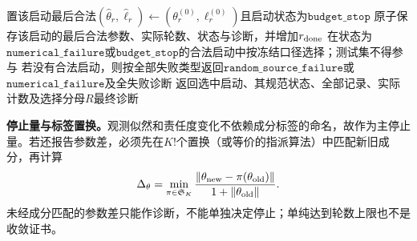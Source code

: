 \begin{AlgorithmContract}
\begin{algorithm}[H]
{  置该启动最后合法$(\widehat\theta_r,\widehat\ell_r)\leftarrow(\theta_r^{(0)},\ell_r^{(0)})$且启动状态为$\mathtt{budget\_stop}$\;
  原子保存该启动的最后合法参数、实际轮数、状态与诊断，并增加$r_{\rm done}$\;
}
在状态为$\mathtt{numerical\_failure}$或$\mathtt{budget\_stop}$的合法启动中按冻结口径选择；测试集不得参与\;
若没有合法启动，则按全部失败类型返回$\mathtt{random\_source\_failure}$或$\mathtt{numerical\_failure}$及全失败诊断\;
返回选中启动、其规范状态、全部记录、实际计数及选择分母$R$最终诊断\;
\end{algorithm}
\end{AlgorithmContract}

\textbf{停止量与标签置换。}观测似然和责任度变化不依赖成分标签的命名，故作为主停止量。若还报告参数差，必须先在$K!$个置换（或等价的指派算法）中匹配新旧成分，再计算
\[
\Delta_\theta=\min_{\pi\in\mathfrak S_K}
\frac{\|\theta_{\rm new}-\pi(\theta_{\rm old})\|}{1+\|\theta_{\rm old}\|}.
\]
未经成分匹配的参数差只能作诊断，不能单独决定停止；单纯达到轮数上限也不是收敛证书。


